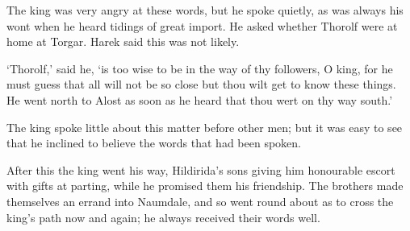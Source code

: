 The king was very angry at these words, but he spoke quietly, as was always his wont when he heard tidings of great import. He asked whether Thorolf were at home at Torgar. Harek said this was not likely.

`Thorolf,' said he, `is too wise to be in the way of thy followers, O king, for he must guess that all will not be so close but thou wilt get to know these things. He went north to Alost as soon as he heard that thou wert on thy way south.'

The king spoke little about this matter before other men; but it was easy to see that he inclined to believe the words that had been spoken.

After this the king went his way, Hildirida's sons giving him honourable escort with gifts at parting, while he promised them his friendship. The brothers made themselves an errand into Naumdale, and so went round about as to cross the king's path now and again; he always received their words well.
